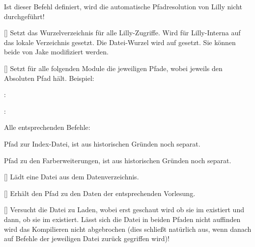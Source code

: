 %
%
%

Ist dieser Befehl definiert, wird die automatische Pfadresolution von Lilly nicht durchgeführt!

%
%
%

[\cmdlist{}]
Setzt das Wurzelverzeichnis für alle Lilly-Zugriffe. Wird für Lilly-Interna auf das lokale Verzeichnis gesetzt. Die Datei-Wurzel wird auf \T{\LILLYxPATHxFILExROOT} gesetzt. Sie können beide von Jake modifiziert werden.

%
%
%

[\cmdlist{}]
Setzt für alle folgenden Module die jeweiligen Pfade, wobei  jeweils den Absoluten Pfad hält. Beispiel:
\begin{ditemize}\narrowitems
    \item {}: \newline\lstshowcmd{\LILLYxPATHxGRAPHICS}
    \item {}: \newline\lstshowcmd{\LILLYxABSPATHxGRAPHICS}
\end{ditemize}\def\stdloperation#1{\blankcmd{LILLYxPATHx#1} (\blankcmd{LILLYxABSPATHx#1})\anothercmd*[1.0.4]{LILLYxPATHx#1}\anothercmd*[1.0.4]{LILLYxABSPATHx#1}}
Alle entsprechenden Befehle: 

%
%
%

Pfad zur Index-Datei, ist aus historischen Gründen noch separat.

%
%
%

Pfad zu den Farberweiterungen, ist aus historischen Gründen noch separat.

%
%
%

[]
Lädt eine Datei aus dem Datenverzeichnis.

%
%
%

[]
Erhält den Pfad zu den Daten der entsprechenden Vorlesung.

%
%
%

[]
Versucht die Datei  zu Laden, wobei erst geschaut wird ob sie im  existiert und dann, ob sie im  existiert. Lässt sich die Datei in beiden Pfaden nicht auffinden wird das Kompilieren nicht abgebrochen (dies schließt natürlich aus, wenn danach auf Befehle der jeweiligen Datei zurück gegriffen wird)!

